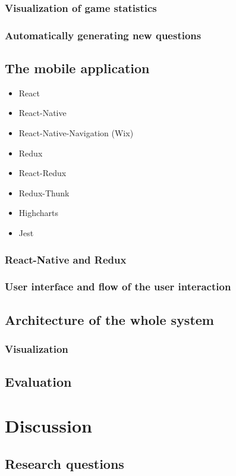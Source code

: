 \documentclass[a4paper,12pt]{book}
\begin{document}
\subsection{Visualization of game statistics}
\subsection{Automatically generating new questions}
\section{The mobile application}
\begin{itemize}
	\item React
	\item React-Native
	\item React-Native-Navigation (Wix)
	\item Redux
	\item React-Redux
	\item Redux-Thunk
	\item Highcharts
	\item Jest
\end{itemize}
\subsection{React-Native and Redux}
\subsection{User interface and flow of the user interaction}
\section{Architecture of the whole system}
\subsection{Visualization}
\section{Evaluation}



\chapter{Discussion}
\section{Research questions}
\end{document}
